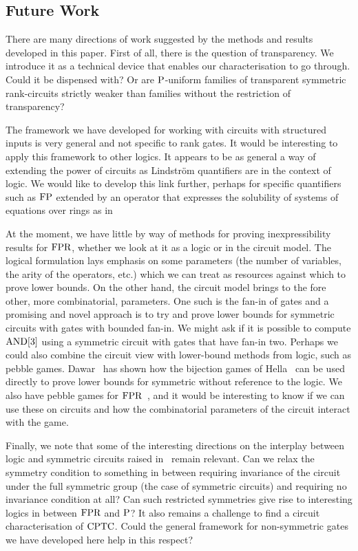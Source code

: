 \documentclass[a4paper,UKenglish]{lipics-v2018}
\begin{document}
\subsection*{Future Work}
There are many directions of work suggested by the methods and results developed
in this paper. First of all, there is the question of transparency. We introduce
it as a technical device that enables our characterisation to go through. Could
it be dispensed with? Or are $\mathrm{P}$-uniform families of transparent symmetric
rank-circuits strictly weaker than families without the restriction of
transparency?

The framework we have developed for working with circuits with structured inputs
is very general and not specific to rank gates. It would be interesting to apply
this framework to other logics. It appears to be as general a way of extending
the power of circuits as Lindstr\"om quantifiers are in the context of logic. We
would like to develop this link further, perhaps for specific quantifiers such
as $\text{\upshape FP}$ extended by an operator that expresses the solubility of systems of
equations over rings as in~\cite{DGHKP}

At the moment, we have little by way of methods for proving inexpressibility
results for $\text{\upshape FPR}$, whether we look at it as a logic or in the circuit model.
The logical formulation lays emphasis on some parameters (the number of
variables, the arity of the operators, etc.) which we can treat as resources
against which to prove lower bounds. On the other hand, the circuit model brings
to the fore other, more combinatorial, parameters. One such is the fan-in of
gates and a promising and novel approach is to try and prove lower bounds for
symmetric circuits with gates with bounded fan-in. We might ask if it is
possible to compute $\text{\upshape AND}[3]$ using a symmetric circuit with gates that have
fan-in two. Perhaps we could also combine the circuit view with lower-bound
methods from logic, such as pebble games. Dawar~\cite{Dawar2016} has shown how
the bijection games of Hella~\cite{Hella19961} can be used directly to prove
lower bounds for symmetric without reference to the logic. We also have pebble
games for $\text{\upshape FPR}$~\cite{DawarH2012}, and it would be interesting to know if we
can use these on circuits and how the combinatorial parameters of the circuit
interact with the game.

Finally, we note that some of the interesting directions on the interplay
between logic and symmetric circuits raised in~\cite{AndersonD17} remain
relevant. Can we relax the symmetry condition to something in between requiring
invariance of the circuit under the full symmetric group (the case of symmetric
circuits) and requiring no invariance condition at all? Can such restricted
symmetries give rise to interesting logics in between $\text{\upshape FPR}$ and $\mathrm{P}$? It also
remains a challenge to find a circuit characterisation of $\text{\upshape CPTC}$. Could the
general framework for non-symmetric gates we have developed here help in this
respect?



% 
\end{document}

